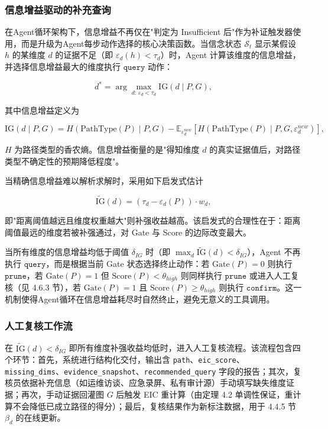 \documentclass[a4paper,12pt]{ctexart}
\begin{document}
\subsubsection{信息增益驱动的补充查询}

在Agent循环架构下，信息增益不再仅在"判定为 Insufficient 后"作为补证触发器使用，而是升级为Agent每步动作选择的核心决策函数。当信念状态 $\mathcal{S}_t$ 显示某假设 $h$ 的某维度 $d$ 的证据不足（即 $\varepsilon_d(h) < \tau_d$）时，Agent 计算该维度的信息增益，并选择信息增益最大的维度执行 $\texttt{query}$ 动作：

\[
d^* = \arg\max_{d:\, \varepsilon_d < \tau_d} \text{IG}(d \mid P, G),
\]

其中信息增益定义为

\[
\text{IG}(d \mid P, G) = H(\text{PathType}(P) \mid P, G) - \mathbb{E}_{\varepsilon_d^{new}}\!\left[ H(\text{PathType}(P) \mid P, G, \varepsilon_d^{new}) \right],
\]

$H$ 为路径类型的香农熵。信息增益衡量的是"得知维度 $d$ 的真实证据值后，对路径类型不确定性的预期降低程度"。

当精确信息增益难以解析求解时，采用如下启发式估计

\[
\widetilde{\text{IG}}(d) = (\tau_d - \varepsilon_d(P)) \cdot w_d,
\]

即"距离阈值越远且维度权重越大"则补强收益越高。该启发式的合理性在于：距离阈值最远的维度若被补强通过，对 Gate 与 Score 的边际改变最大。

当所有维度的信息增益均低于阈值 $\delta_{IG}$ 时（即 $\max_d \widetilde{\text{IG}}(d) < \delta_{IG}$），Agent 不再执行 $\texttt{query}$，而是根据当前 Gate 状态选择终止动作：若 $\text{Gate}(P)=0$ 则执行 $\texttt{prune}$，若 $\text{Gate}(P)=1$ 但 $\text{Score}(P) < \theta_{high}$ 则同样执行 $\texttt{prune}$ 或进入人工复核（见 4.6.3 节），若 $\text{Gate}(P)=1$ 且 $\text{Score}(P) \geq \theta_{high}$ 则执行 $\texttt{confirm}$。这一机制使得Agent循环在信息增益耗尽时自然终止，避免无意义的工具调用。

\subsubsection{人工复核工作流}

在 $\widetilde{\text{IG}}(d) < \delta_{IG}$ 即所有维度补强收益均低时，进入人工复核流程。该流程包含四个环节：首先，系统进行结构化交付，输出含 \texttt{path}、\texttt{eic\_score}、\texttt{missing\_dims}、\texttt{evidence\_snapshot}、\texttt{recommended\_query} 字段的报告；其次，复核员依据补充信息（如运维访谈、应急录屏、私有审计源）手动填写缺失维度证据；再次，手动证据回灌图 $G$ 后触发 EIC 重计算（由定理 4.2 单调性保证，重计算不会降低已成立路径的得分）；最后，复核结果作为新标注数据，用于 4.4.5 节 $\beta_d$ 的在线更新。
\end{document}
